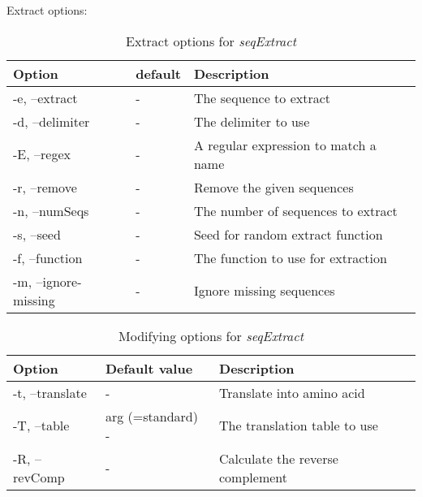 Extract options:
\begin{table}[H]
\caption{Extract options for \textit{seqExtract}}
\begin{tabular}{llp{8cm}}
\hline
Option & default & Description\\
\hline
  -e, --extract        &-& The sequence to extract\\
  -d, --delimiter      &-& The delimiter to use\\
  -E, --regex          &-& A regular expression to match a name\\
  -r, --remove         &-& Remove the given sequences\\
  -n, --numSeqs        &-& The number of sequences to extract\\
  -s, --seed           &-& Seed for random extract function\\
  -f, --function       &-& The function to use for extraction\\
  -m, --ignore-missing &-& Ignore missing sequences\\
  \hline
\end{tabular}
\end{table}



\begin{table}[H]
\caption{Modifying options for \textit{seqExtract}}
\begin{tabular}{llp{8cm}}
\hline
Option & Default value & Description\\
\hline
  -t, --translate &                 -&Translate into amino acid\\
  -T, --table & arg (=standard)     -&The translation table to use\\
  -R, --revComp &                   -&Calculate the reverse complement\\
  \hline
\end{tabular}
\end{table}
